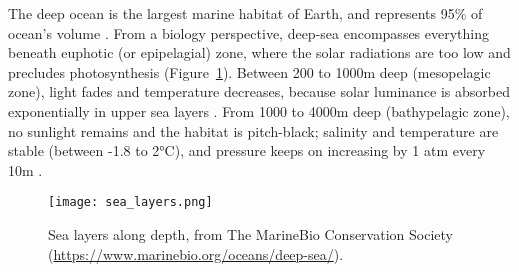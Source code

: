 




The deep ocean is the largest marine habitat of Earth, and represents 95\% of ocean's volume \citep{danovaro2017,salazar2016,webb2010}. From a biology perspective, deep-sea encompasses everything beneath euphotic (or epipelagial) zone, where the solar radiations are too low and precludes photosynthesis \citep{baker2020,danovaro2017,salazar2016} (Figure~\ref{fig:dsl}). Between 200 to 1000m deep (mesopelagic zone), light fades and temperature decreases, because solar luminance is absorbed exponentially in upper sea layers \citep{reynolds2001}. From 1000 to 4000m deep (bathypelagic zone), no sunlight remains and the habitat is pitch-black; salinity and temperature are stable (between -1.8 to 2°C), and pressure keeps on increasing by 1 atm every 10m \citep{danovaro2017}. 

\begin{figure} [!htbp]
	\begin{center}
		\texttt{[image: sea\_layers.png]}
	\end{center}
	\caption[Sea layers]{Sea layers along depth, from The MarineBio Conservation Society (\url{https://www.marinebio.org/oceans/deep-sea/}).}
	\label{fig:dsl}
\end{figure}

